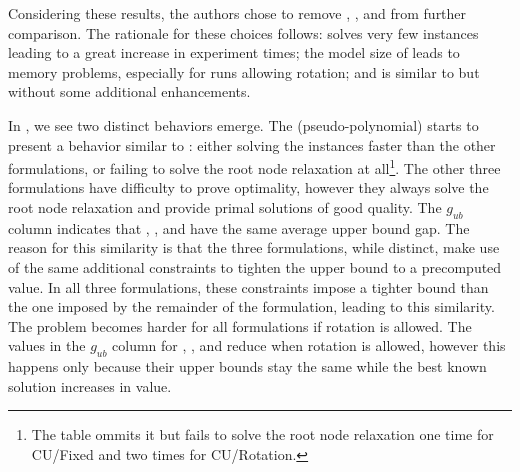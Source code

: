 Considering these results, the authors chose to remove {\modelBCE}, {\modelGrid}, and {\modelFMT} from further comparison.
The rationale for these choices follows: {\modelBCE} solves very few instances leading to a great increase in experiment times; the model size of {\modelGrid} leads to memory problems, especially for runs allowing rotation; and {\modelFMT} is similar to {\modelBecker} but without some additional enhancements.

In , we see two distinct behaviors emerge.
The {\modelBecker} (pseudo-polynomial) starts to present a behavior similar to {\modelFMT}: either solving the instances faster than the other formulations, or failing to solve the root node relaxation at all\footnote{The table ommits it but {\modelBecker} fails to solve the root node relaxation one time for CU/Fixed and two times for CU/Rotation.}.
The other three formulations have difficulty to prove optimality, however they always solve the root node relaxation and provide primal solutions of good quality.
The \(g_{ub}\) column indicates that {\modelHierarchical}, {\modelImplicit}, and {\modelOrigami} have the same average upper bound gap.
The reason for this similarity is that the three formulations, while distinct, make use of the same additional constraints to tighten the upper bound to a precomputed value.
In all three formulations, these constraints impose a tighter bound than the one imposed by the remainder of the formulation, leading to this similarity.
The problem becomes harder for all formulations if rotation is allowed.
The values in the \(g_{ub}\) column for {\modelHierarchical}, {\modelImplicit}, and {\modelOrigami} reduce when rotation is allowed, however this happens only because their upper bounds stay the same while the best known solution increases in value.

